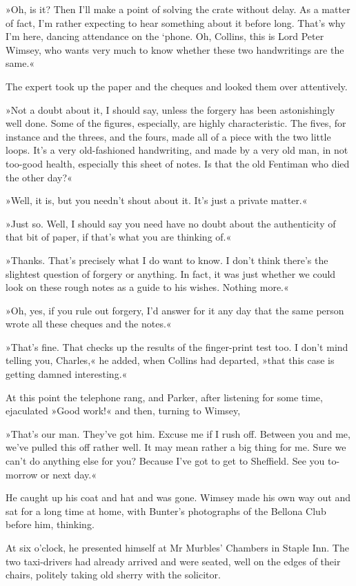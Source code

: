 »Oh, is it? Then I'll make a point of solving the crate without delay. As a matter of fact, I'm rather expecting to hear something about it before long. That's why I'm here, dancing attendance on the `phone. Oh, Collins, this is Lord Peter Wimsey, who wants very much to know whether these two handwritings are the same.«

The expert took up the paper and the cheques and looked them over attentively.

»Not a doubt about it, I should say, unless the forgery has been astonishingly well done. Some of the figures, especially, are highly characteristic. The fives, for instance and the threes, and the fours, made all of a piece with the two little loops. It's a very old-fashioned handwriting, and made by a very old man, in not too-good health, especially this sheet of notes. Is that the old Fentiman who died the other day?«

»Well, it is, but you needn't shout about it. It's just a private matter.«

»Just so. Well, I should say you need have no doubt about the authenticity of that bit of paper, if that's what you are thinking of.«

»Thanks. That's precisely what I do want to know. I don't think there's the slightest question of forgery or anything. In fact, it was just whether we could look on these rough notes as a guide to his wishes. Nothing more.«

»Oh, yes, if you rule out forgery, I'd answer for it any day that the same person wrote all these cheques and the notes.«

»That's fine. That checks up the results of the finger-print test too. I don't mind telling you, Charles,« he added, when Collins had departed, »that this case is getting damned interesting.«

At this point the telephone rang, and Parker, after listening for some time, ejaculated »Good work!« and then, turning to Wimsey,

»That's our man. They've got him. Excuse me if I rush off. Between you and me, we've pulled this off rather well. It may mean rather a big thing for me. Sure we can't do anything else for you? Because I've got to get to Sheffield. See you to-morrow or next day.«

He caught up his coat and hat and was gone. Wimsey made his own way out and sat for a long time at home, with Bunter's photographs of the Bellona Club before him, thinking.

At six o'clock, he presented himself at Mr Murbles' Chambers in Staple Inn. The two taxi-drivers had already arrived and were seated, well on the edges of their chairs, politely taking old sherry with the solicitor.


